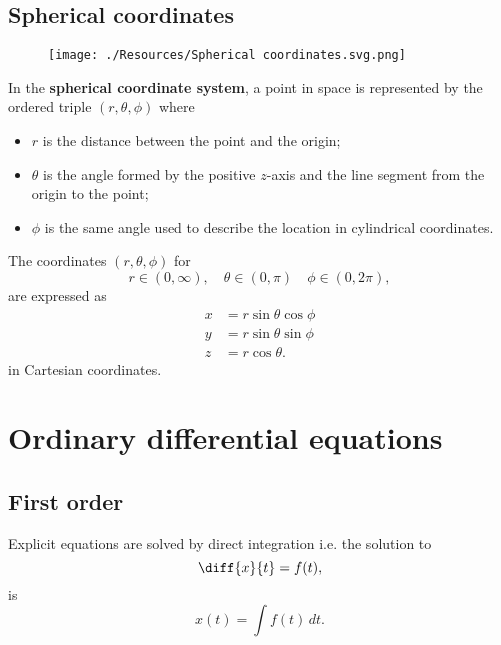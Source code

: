 \documentclass[12pt, a4paper]{article}
\begin{document}
\subsection{Spherical coordinates}

\begin{figure}[H]
     \begin{center}
         \texttt{[image: ./Resources/Spherical coordinates.svg.png]}
     \end{center}
\end{figure}

\begin{definition}
    In the \textbf{spherical coordinate system}, a point in space is represented by the ordered triple \((r,\theta,\phi)\) where
    \begin{itemize}
        \item \(r\) is the distance between the point and the origin;
        \item \(\theta\) is the angle formed by the positive \(z\)-axis and the line segment from the origin to the point;
        \item \(\phi\) is the same angle used to describe the location in cylindrical coordinates.
    \end{itemize}
\end{definition}

\begin{mdthm}
    The coordinates \((r,\theta,\phi)\) for 
    \[r \in (0,\infty), \quad \theta \in (0,\pi) \quad \phi \in (0,2\pi),\]
    are expressed as 
    \[\begin{aligned}
        x &= r\sin\theta\cos\phi \\
        y &= r\sin\theta\sin\phi \\
        z &= r\cos\theta.
    \end{aligned}\]
    in Cartesian coordinates.
\end{mdthm}

\section{Ordinary differential equations}

\subsection{First order}

\begin{theorem}
    Explicit equations are solved by direct integration i.e. the solution to 
    \[\diff{x}{t} = f(t),\]
    is 
    \[x(t) = \int f(t) \, dt.\]
\end{theorem}
\end{document}
